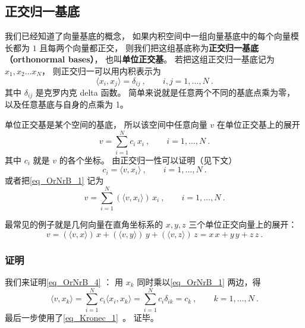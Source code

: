 
\begin{issues}
\issueTODO
\end{issues}



\subsection{正交归一基底}

我们已经知道了向量基底的概念， 如果内积空间中一组向量基底中的每个向量模长都为 $1$ 且每两个向量都正交， 则我们把这组基底称为\textbf{正交归一基底（orthonormal bases）}， 也叫\textbf{单位正交基}。 若把这组正交归一基底记为 $x_1, x_2 \dots x_N$， 则正交归一可以用内积表示为
\begin{equation}\label{eq_OrNrB_3}
\langle x_i, x_j \rangle = \delta_{ij} ~,\qquad i,j = 1,\dots, N~.
\end{equation}
其中 $\delta_{ij}$ 是克罗内克 delta 函数。 简单来说就是任意两个不同的基底点乘为零， 以及任意基底与自身的点乘为 1。

单位正交基是某个空间的基底， 所以该空间中任意向量 $v$ 在单位正交基上的展开
\begin{equation}\label{eq_OrNrB_1}
v = \sum_{i = 1}^N c_i \, x_i ~,\qquad i = 1, \dots, N~.
\end{equation}
其中 $c_i$ 就是 $v$ 的各个坐标。 由正交归一性可以证明（见下文）
\begin{equation}\label{eq_OrNrB_4}
c_i = \langle v, x_i \rangle ~,\qquad i = 1, \dots, N~.
\end{equation}
或者把\autoref{eq_OrNrB_1} 记为
\begin{equation}\label{eq_OrNrB_5}
v = \sum_{i = 1}^N (\langle v, x_i \rangle) \, x_i~, \qquad i = 1, \dots, N~.
\end{equation}

最常见的例子就是几何向量在直角坐标系的 $ x, y, z$ 三个单位正交向量上的展开：
\begin{equation}
v = (\langle v, x \rangle)\, x + (\langle v, y \rangle)\, y + (\langle v, z \rangle)\, z = x \, x + y \, y + z \, z~.
\end{equation} 

\subsubsection{证明}
我们来证明\autoref{eq_OrNrB_4} ： 用 $ x_k$ 同时乘以\autoref{eq_OrNrB_1} 两边，得
\begin{equation}\label{eq_OrNrB_2}
\langle v, x_k \rangle = \sum_{i = 1}^N c_i \langle x_i, x_k \rangle = \sum_{i = 1}^N c_i \delta_{ik} = c_k ~,\qquad k = 1, \dots, N~.
\end{equation}
最后一步使用了\autoref{eq_Kronec_1}~。 证毕。

